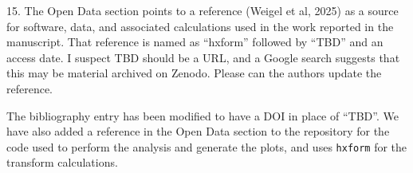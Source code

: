 \documentclass[11pt]{article}
\begin{document}
15. The Open Data section points to a reference (Weigel et al, 2025) as a source for software, data, and associated calculations used in the work reported in the manuscript. That reference is named as “hxform” followed by “TBD” and an access date. I suspect TBD should be a URL, and a Google search suggests that this may be material archived on Zenodo. Please can the authors update the reference.
\\
{\color{violet}
\begin{leftbar}
The bibliography entry has been modified to have a DOI in place of ``TBD''. We have also added a reference in the Open Data section to the repository for the code used to perform the analysis and generate the plots, and uses \texttt{hxform} for the transform calculations.
\end{leftbar}
}

{\raggedright


}
\end{document}
